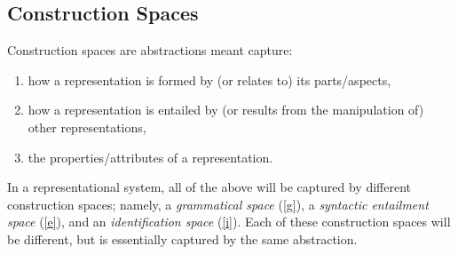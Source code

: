 \documentclass[a4paper]{article}
\theoremstyle{definition}
\begin{document}
	\subsection{Construction Spaces}
		Construction spaces are abstractions meant capture:
		\begin{enumerate}[itemsep=2pt]
			\item how a representation is formed by (or relates to) its parts/aspects, \label{g}
			\item how a representation is entailed by (or results from the manipulation of) other representations,\label{e}
			\item the properties/attributes of a representation.\label{i}
		\end{enumerate} 
	
		In a representational system, all of the above will be captured by different construction spaces; namely, a \textit{grammatical space} (\ref{g}), a \textit{syntactic entailment space} (\ref{e}), and an \textit{identification space} (\ref{i}).
		Each of these construction spaces will be different, but is essentially captured by the same abstraction.
		
\end{document}

